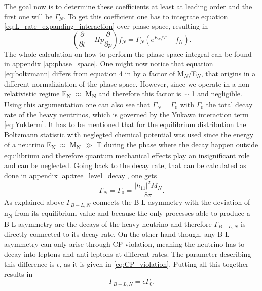 The goal now is to determine these coefficients at least at leading order and the first one will be $\Gamma_N$. To get this coefficient one has to integrate equation \eqref{eq:L_rate_expanding_interaction} over phase space, resulting in
\begin{equation}
	\left(\frac{\partial}{\partial t}-Hp\frac{\partial}{\partial p}\right)f_N=\Gamma_N\left(e^{E_N/T}-f_N\right).
	\label{eq:boltzmann}
\end{equation}
The whole calculation on how to perform the phase space integral can be found in appendix \ref{ap:phase_space}. \newline
One might now notice that equation \eqref{eq:boltzmann} differs from equation 4 in \cite{Bodeker:2013qaa} by a factor of M$_N$/E$_N$, that origins in a different normaliziation of the phase space. However, since we operate in a non-relativistic regime E\textsubscript{N} $\approx$ M\textsubscript{N} and therefore this factor is $\sim$ 1 and negligible. Using this argumentation one can also see that $\Gamma_N=\Gamma_0$ with $\Gamma_0$ the total decay rate of the heavy neutrinos, which is governed by the Yukawa interaction term \eqref{eq:Yukterm}. It has to be mentioned that for the equilibrium distribution the Boltzmann statistic with neglegted chemical potential was used since the energy of a neutrino E\textsubscript{N} $\approx$ M\textsubscript{N} $\gg$ T during the phase where the decay happen outside equilibrium and therefore quantum mechanical effects play an insignificant role and can be neglected. Going back to the decay rate, that can be calculated as done in appendix \ref{ap:tree_level_decay}, one gets
\begin{equation}
\Gamma_N=\Gamma_0=\frac{|h_{11}|^2M_N}{8\pi}.
\label{eq:Gamma_N}
\end{equation}
As explained above $\Gamma_{B-L,N}$ connects the B-L asymmetry with the deviation of n\textsubscript{N} from its equilibrium value and because the only processes able to produce a B-L asymmetry  are the decays of the heavy neutrino and therefore $\Gamma_{B-L,N}$ is directly connected to its decay rate. On the other hand though, any B-L asymmetry can only arise through CP violation, meaning the neutrino has to decay into leptons and anti-leptons at different rates. The parameter describing this difference is $\epsilon$, as it is given in \eqref{eq:CP_violation}. Putting all this together results in 
\begin{equation}
	\Gamma_{B-L,N}=\epsilon\Gamma_0.
	\label{eq:Gamma_B-L,N}
\end{equation}
